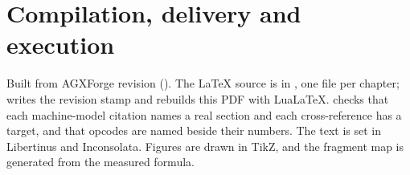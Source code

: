 \documentclass[11pt, letterpaper, oneside, open=any, numbers=noenddot]{scrreprt}
\begin{document}
\part{Compilation, delivery and execution}\label{part:ii}



\appendix
{}






Built from AGXForge revision \code{\docrevision}\ifx\docrevdate\empty\else{} (\docrevdate)\fi. The \LaTeX{} source is in
, one file per chapter;  writes the revision stamp and rebuilds this PDF with
Lua\LaTeX{}.  checks that each machine-model citation names a real
section and each cross-reference has a target, and that opcodes are named beside their numbers. The text is set in Libertinus and
Inconsolata. Figures are drawn in TikZ, and the fragment map is generated from the measured formula.
\end{document}
